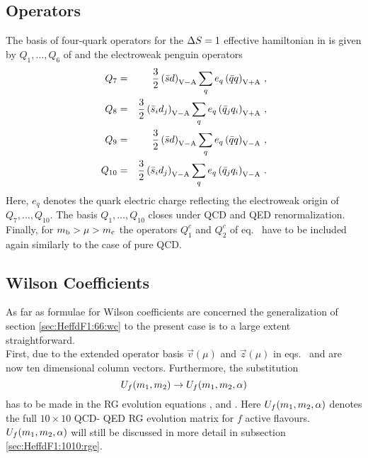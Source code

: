 \subsection{Operators}
            \label{sec:HeffdF1:1010:op}
The basis of four-quark operators for the $\Delta S=1$ effective hamiltonian
in  is given by $Q_1,\ldots,Q_6$ of
 and the electroweak penguin operators
\begin{eqnarray}
Q_{7} & = & \frac{3}{2} \left( \bar s d \right)_{\rm V-A}
         \sum_{q} e_{q} \left( \bar q q \right)_{\rm V+A}
\, , \nonumber \\
Q_{8} & = & \frac{3}{2} \left( \bar s_{i} d_{j} \right)_{\rm V-A}
         \sum_{q} e_{q} \left( \bar q_{j}  q_{i}\right)_{\rm V+A}
\, , \nonumber \\
Q_{9} & = & \frac{3}{2} \left( \bar s d \right)_{\rm V-A}
         \sum_{q} e_{q} \left( \bar q q \right)_{\rm V-A}
\, , \label{eq:dF1:1010basis} \\
Q_{10}& = & \frac{3}{2} \left( \bar s_{i} d_{j} \right)_{\rm V-A}
         \sum_{q} e_{q} \left( \bar q_{j}  q_{i}\right)_{\rm V-A}
\, . \nonumber
\end{eqnarray}
Here, $e_q$ denotes the quark electric charge reflecting the
electroweak origin of $Q_7,\ldots,Q_{10}$.  The basis
$Q_1,\ldots,Q_{10}$ closes under QCD and QED renormalization.  Finally,
for $m_{\rm b} > \mu > m_{\rm c}$ the operators $Q_1^c$ and $Q_2^c$ of
eq.\  have to be included again similarly to the case of
pure QCD.

\subsection{Wilson Coefficients}
            \label{sec:HeffdF1:1010:wc}
As far as formulae for Wilson coefficients are concerned the
generalization of section \ref{sec:HeffdF1:66:wc} to the present case is
to a large extent straightforward. \\
First, due to the extended operator basis $\vec{v}(\mu)$ and
$\vec{z}(\mu)$ in eqs.\  and  are now ten
dimensional column vectors. Furthermore, the substitution
\begin{displaymath}
U_f(m_1,m_2) \to U_f(m_1,m_2,\alpha)
\end{displaymath}
has to be made in the RG evolution equations ,  and
. Here $U_f(m_1,m_2,\alpha)$ denotes the
full $10 \times 10$ QCD- QED RG evolution matrix for $f$ active
flavours. $U_f(m_1,m_2,\alpha)$ will still be discussed in more detail
in subsection \ref{sec:HeffdF1:1010:rge}.

